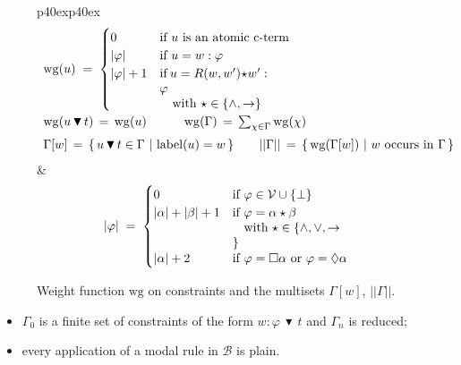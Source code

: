 \documentclass[copyright,creativecommons]{eptcs}
\newcommand{\Diam}{\lozenge}
\newcommand{\PV}{\Vcal}
\newcommand{\lab}[1]{\mathrm{label}(#1)}
\newcommand{\abstractorder}{\,\blacktriangledown\,}%
\newcommand{\size}[1]{|#1|}
\newcommand{\sizem}[1]{||#1||}
\newcommand{\wgname}{\mathrm{wg}}
\newcommand{\wg}[1]{\mathrm{wg}(#1)}
\renewcommand{\a}{\alpha}
\renewcommand{\b}{\beta}
\newcommand{\G}{\Gamma}
\newcommand{\Bcal}{\mathcal{B}}
\newcommand{\Vcal}{\mathcal{V}}
\begin{document}
\begin{figure}[t]
  \centering
  \begin{tabular}{p{40ex}p{40ex}}\small
    \[
    \begin{array}{l}
      \wg{u} \;=\;
      \begin{cases}
        0 & \mbox{if $u$ is an atomic c-term}
        \\
        \size{\varphi}& \mbox{if $u = w:\varphi$}
        \\
        \size{\varphi} + 1&\begin{minipage}[t]{20ex}
          if $u = R(w,w')\star w':\varphi$\par~~~with $\star\in \{\land,\to\}$
        \end{minipage}
      \end{cases}
      \\[7ex]
      \wg{u\abstractorder t}\,=\,\wg{u}
      \hspace{3em}
      \wg{\G}\,=\,\sum_{\chi\in\Gamma} \wg{\chi}
      \\[1.5ex]
      \G[w] \,=\,\{\, u  \abstractorder t\in\G~|~\mbox{$\lab{u} = w$}\,\}
      \qquad
      \sizem{\G} \,=\, \{\, \wg{\G[w]}~|~\mbox{$w$ occurs in $\G$}    \,\}
    \end{array}    
    \]
    &\small
    \[
    \size{\varphi} \;=\;
    \begin{cases}
      0 & \mbox{if $\varphi\in\PV\cup\{\bot\}$}
      \\
      \size{\a} + \size{\b} + 1 &\begin{minipage}[t]{20ex}
        if $\varphi=\a\star\b$\par~~~with $\star\in \{\land,\lor,\to\}$
      \end{minipage}
      \\[2ex]
      \size{\a} + 2 & \mbox{if $\varphi=\Box\a$ or $\varphi=\Diam\a$}
    \end{cases}
    \]
  \end{tabular}
  \vspace{-2ex}
\caption{Weight function $\wgname$ on constraints and the multisets $\G[w]$,  $\sizem{\G}$.}
\label{fig:weight}
\end{figure}
  
\begin{itemize}[leftmargin=*]
\item $\G_0$ is a finite set of constraints of the form
  $w:\varphi\abstractorder t$ and  $\G_n$ is reduced;

\item every application of a modal rule in $\Bcal$ is plain.
\end{itemize}
\end{document}

